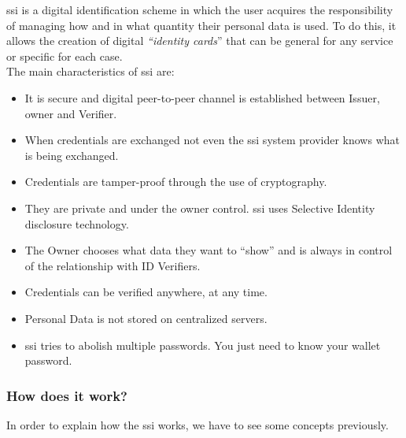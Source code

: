 \documentclass[a4paper, 12pt]{article} %
\begin{document}
            \acrfull{ssi} is a digital identification scheme in which the user acquires the responsibility of managing how and in what quantity their personal data is used. To do this, it allows the creation of digital \textit{“identity cards}” that can be general for any service or specific for each case. \\
            The main characteristics of \acrlong{ssi} are\cite{ssi-guide}:
            \begin{itemize}
                \item It is secure and digital peer-to-peer channel is established between Issuer, owner and Verifier.
                \item When credentials are exchanged not even the \acrlong{ssi} system provider knows what is being exchanged.
                \item Credentials are tamper-proof through the use of cryptography.
                \item They are private and under the owner control. \acrshort{ssi} uses Selective Identity disclosure technology.
                \item The Owner chooses what data they want to “show” and is always in control of the relationship with ID Verifiers.
                \item Credentials can be verified anywhere, at any time.
                \item Personal Data is not stored on centralized servers.
                \item \acrshort{ssi} tries to abolish multiple passwords. You just need to know your wallet password.
            \end{itemize}

            \subsubsection{How does it work?}
                In order to explain how the \acrshort{ssi} works, we have to see some concepts previously.
\end{document}
